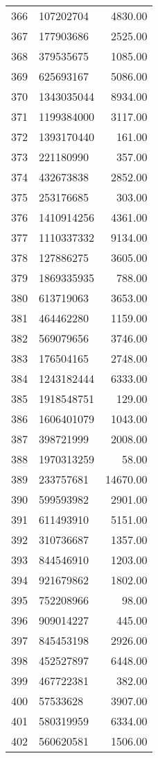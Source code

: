 \begin{table}[ht]
\begin{tabular}{rlr}
  366 & 107202704 & 4830.00 \\ 
  367 & 177903686 & 2525.00 \\ 
  368 & 379535675 & 1085.00 \\ 
  369 & 625693167 & 5086.00 \\ 
  370 & 1343035044 & 8934.00 \\ 
  371 & 1199384000 & 3117.00 \\ 
  372 & 1393170440 & 161.00 \\ 
  373 & 221180990 & 357.00 \\ 
  374 & 432673838 & 2852.00 \\ 
  375 & 253176685 & 303.00 \\ 
  376 & 1410914256 & 4361.00 \\ 
  377 & 1110337332 & 9134.00 \\ 
  378 & 127886275 & 3605.00 \\ 
  379 & 1869335935 & 788.00 \\ 
  380 & 613719063 & 3653.00 \\ 
  381 & 464462280 & 1159.00 \\ 
  382 & 569079656 & 3746.00 \\ 
  383 & 176504165 & 2748.00 \\ 
  384 & 1243182444 & 6333.00 \\ 
  385 & 1918548751 & 129.00 \\ 
  386 & 1606401079 & 1043.00 \\ 
  387 & 398721999 & 2008.00 \\ 
  388 & 1970313259 & 58.00 \\ 
  389 & 233757681 & 14670.00 \\ 
  390 & 599593982 & 2901.00 \\ 
  391 & 611493910 & 5151.00 \\ 
  392 & 310736687 & 1357.00 \\ 
  393 & 844546910 & 1203.00 \\ 
  394 & 921679862 & 1802.00 \\ 
  395 & 752208966 & 98.00 \\ 
  396 & 909014227 & 445.00 \\ 
  397 & 845453198 & 2926.00 \\ 
  398 & 452527897 & 6448.00 \\ 
  399 & 467722381 & 382.00 \\ 
  400 & 57533628 & 3907.00 \\ 
  401 & 580319959 & 6334.00 \\ 
  402 & 560620581 & 1506.00 \\ 

\end{tabular}
\end{table}
